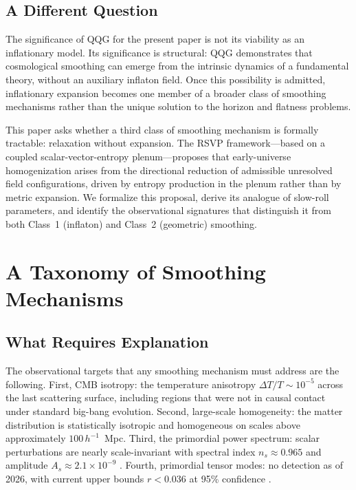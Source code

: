 \documentclass[12pt, a4paper]{article}
\begin{document}
\subsection{A Different Question}

The significance of QQG for the present paper is not its viability as an
inflationary model. Its significance is structural: QQG demonstrates that
cosmological smoothing can emerge from the intrinsic dynamics of a fundamental
theory, without an auxiliary inflaton field. Once this possibility is admitted,
inflationary expansion becomes one member of a broader class of smoothing
mechanisms rather than the unique solution to the horizon and flatness problems.

This paper asks whether a third class of smoothing mechanism is formally tractable:
relaxation without expansion. The RSVP framework---based on a coupled
scalar-vector-entropy plenum---proposes that early-universe homogenization arises
from the directional reduction of admissible unresolved field configurations, driven
by entropy production in the plenum rather than by metric expansion. We formalize
this proposal, derive its analogue of slow-roll parameters, and identify the
observational signatures that distinguish it from both Class~1 (inflaton) and
Class~2 (geometric) smoothing.

\section{A Taxonomy of Smoothing Mechanisms}
\label{sec:taxonomy}

\subsection{What Requires Explanation}

The observational targets that any smoothing mechanism must address are the
following. First, CMB isotropy: the temperature anisotropy $\Delta T / T \sim
10^{-5}$ across the last scattering surface, including regions that were not in
causal contact under standard big-bang evolution. Second, large-scale homogeneity:
the matter distribution is statistically isotropic and homogeneous on scales above
approximately $100\,h^{-1}$~Mpc. Third, the primordial power spectrum: scalar
perturbations are nearly scale-invariant with spectral index $n_s \approx 0.965$
and amplitude $A_s \approx 2.1 \times 10^{-9}$ \citep{Planck2020}. Fourth,
primordial tensor modes: no detection as of 2026, with current upper bounds
$r < 0.036$ at 95\% confidence \citep{BICEPKeck2021}.
\end{document}
